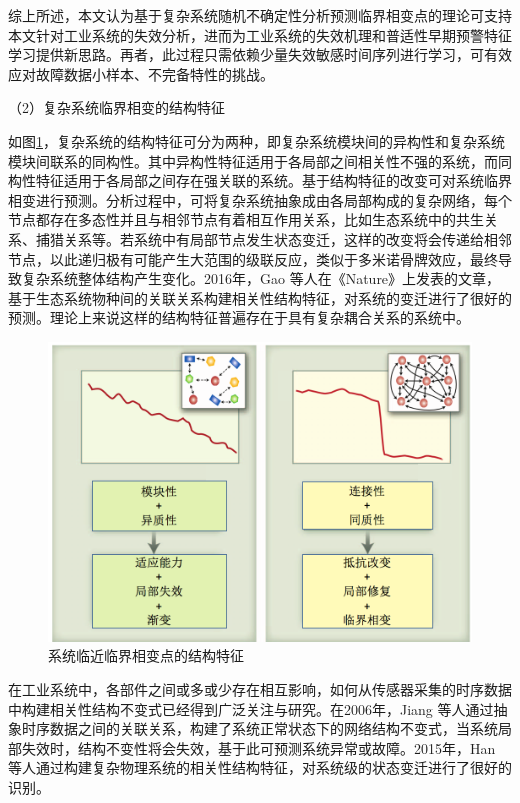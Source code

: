 综上所述，本文认为基于复杂系统随机不确定性分析预测临界相变点的理论可支持本文针对工业系统的失效分析，进而为工业系统的失效机理和普适性{\heiti 早期预警特征}学习提供新思路。再者，此过程只需依赖少量失效敏感时间序列进行学习，可有效应对故障数据小样本、不完备特性的挑战。



（2）复杂系统临界相变的结构特征

如图\ref{fig:csd-early-warning-structure}，复杂系统的结构特征可分为两种，即复杂系统模块间的异构性和复杂系统模块间联系的同构性。其中异构性特征适用于各局部之间相关性不强的系统，而同构性特征适用于各局部之间存在强关联的系统。基于结构特征的改变可对系统临界相变进行预测。分析过程中，可将复杂系统抽象成由各局部构成的复杂网络，每个节点都存在多态性并且与相邻节点有着相互作用关系，比如生态系统中的共生关系、捕猎关系等。若系统中有局部节点发生状态变迁，这样的改变将会传递给相邻节点，以此递归极有可能产生大范围的级联反应，类似于多米诺骨牌效应，最终导致复杂系统整体结构产生变化。2016年，Gao 等人在《Nature》上发表的文章，基于生态系统物种间的关联关系构建相关性结构特征，对系统的变迁进行了很好的预测\cite{gao2016universal}。理论上来说这样的结构特征普遍存在于具有复杂耦合关系的系统中。
\begin{figure}[H]
\centering
\includegraphics[scale=0.5]{figures/csd-early-warning-structure.png}
\caption{系统临近临界相变点的结构特征\cite{scheffer2012anticipating}}
\label{fig:csd-early-warning-structure}
\end{figure}

在工业系统中，各部件之间或多或少存在相互影响，如何从传感器采集的时序数据中构建相关性结构不变式已经得到广泛关注与研究。在2006年，Jiang 等人通过抽象时序数据之间的关联关系，构建了系统正常状态下的网络结构不变式，当系统局部失效时，结构不变性将会失效，基于此可预测系统异常或故障\cite{jiang2006discovering}。2015年，Han 等人通过构建复杂物理系统的相关性结构特征，对系统级的状态变迁进行了很好的识别\cite{han2015time}。

